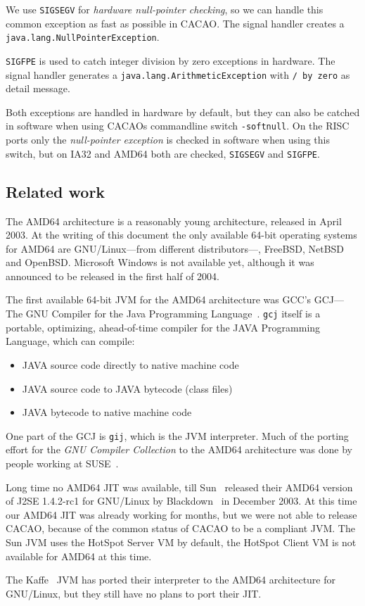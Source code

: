 We use \texttt{SIGSEGV} for \textit{hardware null-pointer checking},
so we can handle this common exception as fast as possible in
CACAO. The signal handler creates a
\texttt{java.lang.NullPointerException}.

\texttt{SIGFPE} is used to catch integer division by zero exceptions
in hardware. The signal handler generates a
\texttt{java.lang.ArithmeticException} with \texttt{/ by zero} as detail
message.

Both exceptions are handled in hardware by default, but they can also
be catched in software when using CACAOs commandline switch
\texttt{-softnull}. On the RISC ports only the \textit{null-pointer
exception} is checked in software when using this switch, but on IA32
and AMD64 both are checked, \texttt{SIGSEGV} and \texttt{SIGFPE}.


\subsection{Related work}

The AMD64 architecture is a reasonably young architecture, released in
April 2003. At the writing of this document the only available 64-bit
operating systems for AMD64 are GNU/Linux---from different
distributors---, FreeBSD, NetBSD and OpenBSD. Microsoft Windows is not
available yet, although it was announced to be released in the first
half of 2004.

The first available 64-bit JVM for the AMD64 architecture was GCC's
GCJ---The GNU Compiler for the Java Programming
Language~\cite{GCJ}. \texttt{gcj} itself is a portable, optimizing,
ahead-of-time compiler for the JAVA Programming Language, which can
compile:

\begin{itemize}
\item JAVA source code directly to native machine code
\item JAVA source code to JAVA bytecode (class files)
\item JAVA bytecode to native machine code
\end{itemize}

One part of the GCJ is \texttt{gij}, which is the JVM
interpreter. Much of the porting effort for the \textit{GNU Compiler
Collection} to the AMD64 architecture was done by people working at
SUSE~\cite{SUSE}.

Long time no AMD64 JIT was available, till Sun~\cite{Sun} released
their AMD64 version of J2SE 1.4.2-rc1 for GNU/Linux by
Blackdown~\cite{Blackdown} in December 2003. At this time our AMD64
JIT was already working for months, but we were not able to release
CACAO, because of the common status of CACAO to be a compliant
JVM. The Sun JVM uses the HotSpot Server VM by default, the HotSpot
Client VM is not available for AMD64 at this time.

The Kaffe~\cite{Wilkinson:97} JVM has ported their interpreter to the
AMD64 architecture for GNU/Linux, but they still have no plans to port
their JIT.
